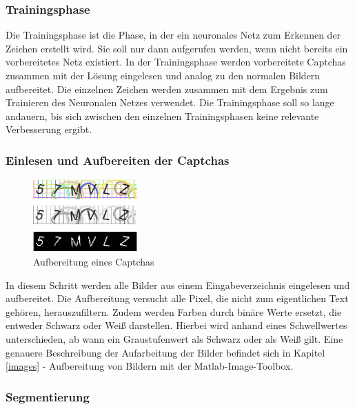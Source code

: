 \subsubsection{Trainingsphase}

Die Trainingsphase ist die Phase, in der ein neuronales Netz zum Erkennen der
Zeichen erstellt wird. Sie soll nur dann aufgerufen werden, wenn
nicht bereits ein vorbereitetes Netz existiert. In der Trainingsphase werden
vorbereitete Captchas zusammen mit der Lösung eingelesen und analog zu den
normalen Bildern aufbereitet. Die einzelnen Zeichen werden zusammen mit dem
Ergebnis zum Trainieren des Neuronalen Netzes verwendet. Die Trainingsphase
soll so lange andauern, bis sich zwischen den einzelnen Trainingsphasen keine
relevante Verbesserung ergibt.

\subsubsection{Einlesen und Aufbereiten der Captchas}

\begin{figure}
  \begin{center}
  \vspace{-48pt}
    \includegraphics[width=4cm]{res/Aufbereitung.png}
  \end{center}
  \caption{Aufbereitung eines Captchas}
\end{figure}

In diesem Schritt werden alle Bilder aus einem Eingabeverzeichnis eingelesen und
aufbereitet. Die Aufbereitung versucht alle Pixel, die nicht zum eigentlichen
Text gehören, herauszufiltern. Zudem werden Farben durch binäre Werte ersetzt,
die entweder Schwarz oder Weiß darstellen. Hierbei wird anhand eines
Schwellwertes unterschieden, ab wann ein Graustufenwert als Schwarz oder als
Weiß gilt. Eine genauere Beschreibung der Aufarbeitung der Bilder befindet sich
in Kapitel \ref{images} - Aufbereitung von Bildern mit der Matlab-Image-Toolbox.


\subsubsection{Segmentierung}
\label{segment}

